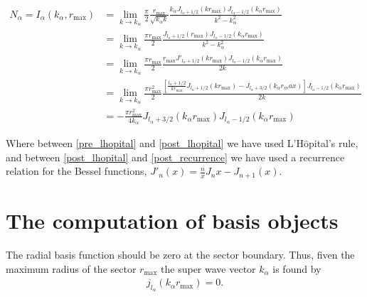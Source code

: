 \documentclass[11pt, oneside]{article}   	%
\begin{document}
\begin{align}
N_\alpha = I_\alpha(k_\alpha,  r_\text{max}) & = \lim_{k\to k_\alpha} \frac{\pi}{2} \frac{ r_\text{max}}{ \sqrt{ k _ \alpha k}}\frac{k_\alpha J_{l_\alpha+ 1/2}( k  r_\text{max})J_{l_\alpha- 1/2}(k_\alpha  r_\text{max})}{k^2 - k_\alpha^2}\\
&=\lim_{k\to k_\alpha}\frac{\pi r_\text{max}}{2} \frac{J_{l_\alpha+ 1/2}( r_\text{max})J_{l_\alpha- 1/2}(k_\alpha  r_\text{max})}{k^2 - k_\alpha^2}\label{pre_lhopital}\\
&=\lim_{k\to k_\alpha}\frac{\pi r_\text{max}}{2} \frac{r_\text{max}J'_{l_\alpha+ 1/2}(k r_\text{max})J_{l_\alpha- 1/2}(k_\alpha  r_\text{max})}{2 k}\label{post_lhopital}\\
&=\lim_{k\to k_\alpha}\frac{\pi r_\text{max}^2}{2} \frac{\left[\frac{l_\alpha+1/2}{k r_{\text{max}}}J_{l_\alpha+1/2}(k r_\text{max})-J_{l_\alpha+3/2}(k_\alpha{r_max})\right]J_{l_\alpha- 1/2}(k_\alpha  r_\text{max})}{2 k}\label{post_recurrence}\\
&=-\frac{\pi r_\text{max}^2}{4 k_\alpha}J_{l_\alpha+3/2}(k_\alpha{r_\text{max}})J_{l_\alpha- 1/2}(k_\alpha  r_\text{max})\label{norm_final}
\end{align}

Where between \eqref{pre_lhopital} and \eqref{post_lhopital} we have used L'H$\hat{\text{o}}$pital's rule, and between \eqref{post_lhopital} and \eqref{post_recurrence} we have used a recurrence relation for the Bessel functions, $J'_n(x)=\frac{n}{x}J_n{x}-J_{n+1}(x)$.
\section{The computation of basis objects}
The radial basis function should be zero at the sector boundary. Thus, fiven the maximum radius of the sector $r_\text{max}$ the super wave vector $k_\alpha$ is found by 
\begin{align}
 j_{l_\alpha}(k_\alpha r_\text{max})=0.
 \end{align}
\end{document}
